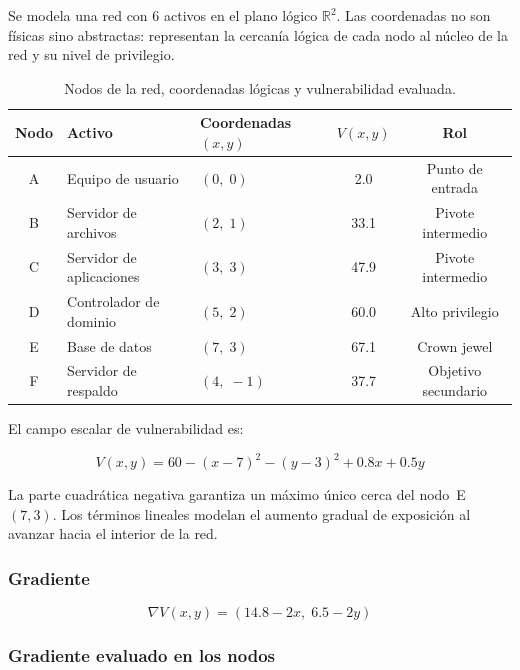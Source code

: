 \documentclass[12pt,a4paper]{article}
\newcommand{\grad}{\nabla}
\begin{document}
Se modela una red con 6 activos en el plano lógico $\mathbb{R}^2$.
Las coordenadas no son físicas sino abstractas: representan la cercanía
lógica de cada nodo al núcleo de la red y su nivel de privilegio.

\begin{table}[H]
  \centering
  \caption{Nodos de la red, coordenadas lógicas y vulnerabilidad evaluada.}
  \begin{tabular}{@{}cllcc@{}}
    \toprule
    Nodo & Activo & Coordenadas $(x,y)$ & $V(x,y)$ & Rol \\
    \midrule
    A & Equipo de usuario        & $(0,\;0)$   & 2.0  & Punto de entrada \\
    B & Servidor de archivos     & $(2,\;1)$   & 33.1 & Pivote intermedio \\
    C & Servidor de aplicaciones & $(3,\;3)$   & 47.9 & Pivote intermedio \\
    D & Controlador de dominio   & $(5,\;2)$   & 60.0 & Alto privilegio \\
    E & Base de datos            & $(7,\;3)$   & 67.1 & Crown jewel \\
    F & Servidor de respaldo     & $(4,\;-1)$  & 37.7 & Objetivo secundario \\
    \bottomrule
  \end{tabular}
\end{table}

El campo escalar de vulnerabilidad es:

\begin{equation}
  V(x,y) = 60 - (x-7)^2 - (y-3)^2 + 0.8x + 0.5y
  \label{eq:V}
\end{equation}

La parte cuadrática negativa garantiza un máximo único cerca del nodo~E
$(7,3)$. Los términos lineales modelan el aumento gradual de exposición
al avanzar hacia el interior de la red.

\subsubsection{Gradiente}

\begin{equation}
  \grad V(x,y) = (14.8 - 2x,\; 6.5 - 2y)
\end{equation}

\subsubsection{Gradiente evaluado en los nodos}
\end{document}
